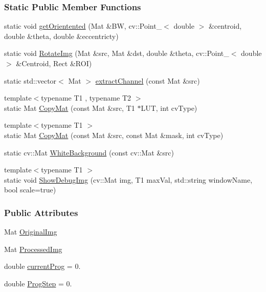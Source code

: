 \subsubsection*{Static Public Member Functions}
\begin{DoxyCompactItemize}
\item 
static void \hyperlink{class_vision_1_1_image_processing_a052aaae527703c3991310b9b1e704576}{get\+Orientented} (Mat \&B\+W, cv\+::\+Point\+\_\+$<$ double $>$ \&centroid, double \&theta, double \&eccentricty)
\item 
static void \hyperlink{class_vision_1_1_image_processing_a2cbae1b5d9542edab2e59da8e3e23d2a}{Rotate\+Img} (Mat \&src, Mat \&dst, double \&theta, cv\+::\+Point\+\_\+$<$ double $>$ \&Centroid, Rect \&R\+O\+I)
\item 
static std\+::vector$<$ Mat $>$ \hyperlink{class_vision_1_1_image_processing_ad5fa51caaabb8cb0fc2c15f645695a3c}{extract\+Channel} (const Mat \&src)
\item 
{\footnotesize template$<$typename T1 , typename T2 $>$ }\\static Mat \hyperlink{class_vision_1_1_image_processing_a16f96c26c7c5c6feb7ac103b9b478682}{Copy\+Mat} (const Mat \&src, T1 $\ast$L\+U\+T, int cv\+Type)
\item 
{\footnotesize template$<$typename T1 $>$ }\\static Mat \hyperlink{class_vision_1_1_image_processing_a5a255d7f5b10bcb199e66d1e00ab9d1a}{Copy\+Mat} (const Mat \&src, const Mat \&mask, int cv\+Type)
\item 
static cv\+::\+Mat \hyperlink{class_vision_1_1_image_processing_aaa8b17b356ca4300857f05a6d6558a43}{White\+Background} (const cv\+::\+Mat \&src)
\item 
{\footnotesize template$<$typename T1 $>$ }\\static void \hyperlink{class_vision_1_1_image_processing_a97407ef83de37496d30d6defe3165edd}{Show\+Debug\+Img} (cv\+::\+Mat img, T1 max\+Val, std\+::string window\+Name, bool scale=true)
\end{DoxyCompactItemize}
\subsubsection*{Public Attributes}
\begin{DoxyCompactItemize}
\item 
Mat \hyperlink{class_vision_1_1_image_processing_a77c370dab270158a4e9c634e2d3f48e7}{Original\+Img}
\item 
Mat \hyperlink{class_vision_1_1_image_processing_aa7d65742882cd1b2a1e4e9cb68809211}{Processed\+Img}
\item 
double \hyperlink{class_vision_1_1_image_processing_ac06b3b9501cde8e742aaf99d986af256}{current\+Prog} = 0.
\item 
double \hyperlink{class_vision_1_1_image_processing_a7438451f9a447a33e9f04bf8e73eae31}{Prog\+Step} = 0.
\end{DoxyCompactItemize}
